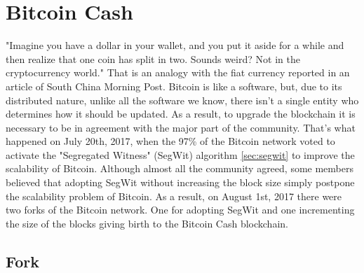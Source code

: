 \chapter{Bitcoin Cash}
\label{cha:bch}

"Imagine you have a dollar in your wallet, and you put it aside for a while and 
then realize that one coin has split in two. Sounds weird? Not in the cryptocurrency 
world." That is an analogy with the fiat currency reported in an article of 
South China Morning Post\cite{scmp}.
Bitcoin is like a software, but, due to its distributed nature, unlike all the 
software we know, there isn't a single entity who determines how it should be 
updated. As a result, to upgrade the blockchain it is necessary to be in 
agreement with the major part of the community. That's what happened on July 20th,
2017, when the 97\% of the Bitcoin network voted to activate the "Segregated 
Witness" (SegWit) algorithm \ref{sec:segwit} to improve the scalability of Bitcoin. Although almost 
all the community agreed, some members believed that adopting SegWit without 
increasing the block size simply postpone the scalability problem of Bitcoin.
As a result, on August 1st, 2017 there were two forks of the Bitcoin network. 
One for adopting SegWit and one incrementing the size of the blocks giving 
birth to the Bitcoin Cash blockchain.\cite{scmp}\cite{thecryptonomist}

\section{Fork}
\label{sec:fork}

